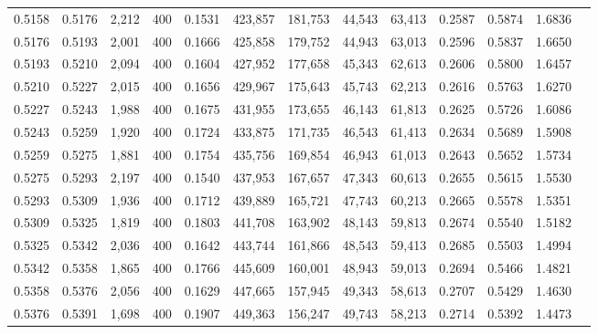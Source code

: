 \begin{tabular}{rrrrrrrrrrrrr}
0.5158 & 0.5176 &  2,212 & 400 &                                     0.1531 & 423,857 & 181,753 &  44,543 &  63,413 & 0.2587 & 0.5874 & 1.6836 \\
0.5176 & 0.5193 &  2,001 & 400 &                                     0.1666 & 425,858 & 179,752 &  44,943 &  63,013 & 0.2596 & 0.5837 & 1.6650 \\
0.5193 & 0.5210 &  2,094 & 400 &                                     0.1604 & 427,952 & 177,658 &  45,343 &  62,613 & 0.2606 & 0.5800 & 1.6457 \\
0.5210 & 0.5227 &  2,015 & 400 &                                     0.1656 & 429,967 & 175,643 &  45,743 &  62,213 & 0.2616 & 0.5763 & 1.6270 \\
0.5227 & 0.5243 &  1,988 & 400 &                                     0.1675 & 431,955 & 173,655 &  46,143 &  61,813 & 0.2625 & 0.5726 & 1.6086 \\
0.5243 & 0.5259 &  1,920 & 400 &                                     0.1724 & 433,875 & 171,735 &  46,543 &  61,413 & 0.2634 & 0.5689 & 1.5908 \\
0.5259 & 0.5275 &  1,881 & 400 &                                     0.1754 & 435,756 & 169,854 &  46,943 &  61,013 & 0.2643 & 0.5652 & 1.5734 \\
0.5275 & 0.5293 &  2,197 & 400 &                                     0.1540 & 437,953 & 167,657 &  47,343 &  60,613 & 0.2655 & 0.5615 & 1.5530 \\
0.5293 & 0.5309 &  1,936 & 400 &                                     0.1712 & 439,889 & 165,721 &  47,743 &  60,213 & 0.2665 & 0.5578 & 1.5351 \\
0.5309 & 0.5325 &  1,819 & 400 &                                     0.1803 & 441,708 & 163,902 &  48,143 &  59,813 & 0.2674 & 0.5540 & 1.5182 \\
0.5325 & 0.5342 &  2,036 & 400 &                                     0.1642 & 443,744 & 161,866 &  48,543 &  59,413 & 0.2685 & 0.5503 & 1.4994 \\
0.5342 & 0.5358 &  1,865 & 400 &                                     0.1766 & 445,609 & 160,001 &  48,943 &  59,013 & 0.2694 & 0.5466 & 1.4821 \\
0.5358 & 0.5376 &  2,056 & 400 &                                     0.1629 & 447,665 & 157,945 &  49,343 &  58,613 & 0.2707 & 0.5429 & 1.4630 \\
0.5376 & 0.5391 &  1,698 & 400 &                                     0.1907 & 449,363 & 156,247 &  49,743 &  58,213 & 0.2714 & 0.5392 & 1.4473 \\

\end{tabular}
